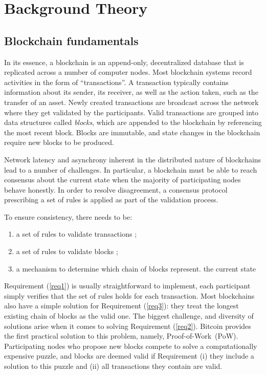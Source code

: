 \chapter{Background Theory}
\label{ch:background}
\section{Blockchain fundamentals}
In its essence, a blockchain is an append-only, decentralized database that is replicated across a number of computer nodes. 
Most blockchain systems record activities in the form of ``transactions''. 
A transaction typically contains information about its sender, its receiver, as well as the action taken, such as the transfer of an asset. 
Newly created transactions are broadcast across the network where they get validated by the participants. 
Valid transactions are grouped into data structures called \textit{blocks}, which are appended to the blockchain by referencing the most recent block.
Blocks are immutable, and state changes in the blockchain require new blocks to be produced.

Network latency and asynchrony inherent in the distributed nature of blockchains lead to a number of challenges. 
In particular, a blockchain must be able to reach consensus about the current state when the majority of participating nodes behave honestly. 
In order to resolve disagreement, a consensus protocol prescribing a set of rules is applied as part of the validation process. 

To ensure consistency, there needs to be:

\begin{enumerate}\itemsep=-1pt
\item a set of rules to validate transactions \label{req1};
\item a set of rules to validate blocks \label{req2};
\item a mechanism to determine which chain of blocks represent. the current state \label{req3}
\end{enumerate}
%
Requirement (\ref{req1}) is usually straightforward to implement, each participant simply verifies that the set of rules holds for each transaction.
Most blockchains also have a simple solution for Requirement (\ref{req3}): they treat the longest existing chain of blocks as the valid one.
The biggest challenge, and diversity of solutions arise when it comes to solving Requirement (\ref{req2}).
Bitcoin provides the first practical solution to this problem, namely, Proof-of-Work~(PoW). Participating nodes who propose new blocks compete to solve a computationally expensive puzzle, and blocks are deemed valid if Requirement (i) they include a solution to this puzzle and (ii) all transactions they contain are valid.

